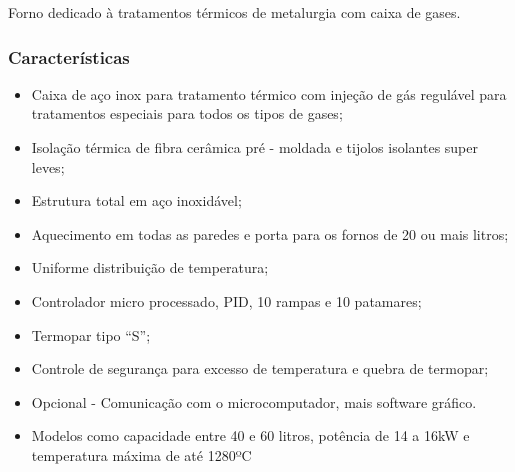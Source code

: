 Forno dedicado à tratamentos térmicos de metalurgia com caixa de gases.

\subsubsection{Características}

\begin{itemize}
	\item Caixa de aço inox para tratamento térmico com injeção de gás regulável para tratamentos especiais para todos os tipos de gases;
	\item Isolação térmica de fibra cerâmica pré - moldada e tijolos isolantes super leves;
	\item Estrutura total em aço inoxidável;
	\item Aquecimento em todas as paredes e porta para os fornos de 20 ou mais litros;
	\item Uniforme distribuição de temperatura;
	\item Controlador micro processado, PID, 10 rampas e 10 patamares;
	\item Termopar tipo “S”;
	\item Controle de segurança para excesso de temperatura e quebra de termopar;
	\item Opcional - Comunicação com o microcomputador, mais software gráfico.
	\item Modelos como capacidade entre 40 e 60 litros, potência de 14 a 16kW e temperatura máxima de até 1280ºC
	
\end{itemize}


